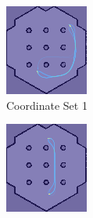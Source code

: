 \documentclass[]{article}
\begin{document}
	\begin{figure}[ht]
		\centering
		\begin{subfigure}[b]{0.45\textwidth}
			\centering
			\includegraphics[width=\textwidth]{Graphics/heatmapsim1.png}
			\caption{Coordinate Set 1}
			\label{fig:fig10}
		\end{subfigure}
		\hfill
		\begin{subfigure}[b]{0.45\textwidth}
			\centering
			\includegraphics[width=\textwidth]{Graphics/heatmapsim2.png}

\end{subfigure}
\end{figure}
\end{document}
